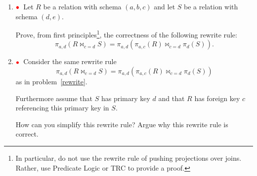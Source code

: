 \documentclass[11pt]{article}
\newcommand{\red}[1]{{\color{red}#1}}
\newcommand{\redbullet}{$\red{\bullet}$}
\begin{document}
\begin{enumerate}[resume]
Observe that there are six cases to consider:
{\footnotesize
{\tt
\begin{enumerate}
\item   exists (... union ...)
\item   exists (... intersect ...)
\item   exists (... except ...)
\item   not exists (... union ...)
\item   not exists (... intersect ...)
\item   not exists (... except ...)
\end{enumerate}
}}

\redbullet\ Show how such SQL queries can be translated to equivalent RA expressions in standard notation.
Be careful in the translation since you should take into account that
projections do not in general distribute over intersections and over set differences.



To get practice, first consider the following special case where $n=1$, $m=1$, and $k=1$.
I.e., the following case:  \footnote{Once you can handle this case, the
general case is a similar.}

{\footnotesize
\begin{verbatim}
select L1(r)
from   R r
where  C1(r) and [not] exists (select L2(s)
                               from   S s
                               where  C2(s,r)
                               [union | intersect | except]
                               select L3(t)
                               from   T t
                               where  C3(t,r))
\end{verbatim}
}



\item \label{rewrite}\redbullet\ Let $R$ be a relation with schema $(a,b,c)$ and let $S$ be a relation
with schema $(d,e)$.  

Prove, from first principles\footnote{In particular, do not use the rewrite rule of pushing projections over joins.  Rather, use
Predicate Logic or TRC to provide a proof.}, the correctness of the following rewrite rule:
\[{\pi_{a,d}(R \bowtie_{c = d}S) = \pi_{a,d}(\pi_{a,c}(R)\bowtie_{c=d}\pi_{d}(S))}.\]

 \item\redbullet\ Consider the same rewrite rule 
 \[\pi_{a,d}(R \bowtie_{c = d}S) = \pi_{a,d}(\pi_{a,c}(R)\bowtie_{c=d}\pi_{d}(S))\]
 as in problem~\ref{rewrite}.
 
 Furthermore assume that $S$ has  primary key $d$ and that $R$ has foreign key
 $c$ referencing this primary key in $S$.
 
 How can you simplify this rewrite rule?
 Argue why this rewrite rule is correct.

\end{enumerate}
\end{document}
